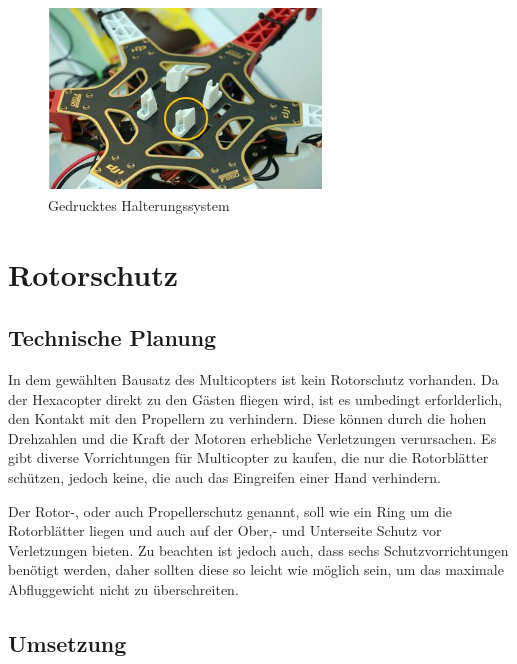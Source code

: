 			\begin{figure}[tbh]
			\begin{centering}
			\includegraphics[width = 0.65\textwidth]{Bilder/halterung_cupcake_fertig_hinweis}
			\par\end{centering}
			\caption{Gedrucktes Halterungssystem}
			\label{halterung_cupcake_fertig_hinweis}
			\end{figure}

			\newpage

\section{Rotorschutz}

	\subsection{Technische Planung}

	In dem gewählten Bausatz des Multicopters ist kein Rotorschutz vorhanden.
	Da der Hexacopter direkt zu den Gästen fliegen wird, ist es umbedingt erforlderlich, den Kontakt mit den Propellern zu verhindern.
	Diese können durch die hohen Drehzahlen und die Kraft der Motoren erhebliche Verletzungen verursachen.
	Es gibt diverse Vorrichtungen für Multicopter zu kaufen, die nur die Rotorblätter schützen, jedoch keine, die auch das Eingreifen einer Hand verhindern.

	Der Rotor-, oder auch Propellerschutz genannt, soll wie ein Ring um die Rotorblätter liegen und auch auf der Ober,- und Unterseite Schutz vor Verletzungen bieten.
	Zu beachten ist jedoch auch, dass sechs Schutzvorrichtungen benötigt werden, daher sollten diese so leicht wie möglich sein, um das maximale Abfluggewicht nicht zu überschreiten.

	\subsection{Umsetzung}


